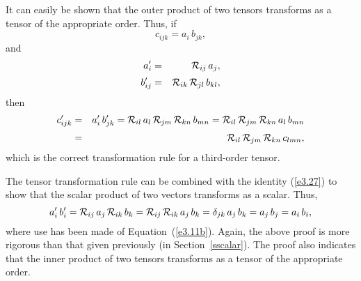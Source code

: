 It can easily be shown that the outer product of two tensors transforms as a tensor of the appropriate order.
Thus, if
\begin{equation}
c_{ijk} = a_i\,b_{jk},
\end{equation}
and
\begin{eqnarray}
a_i' &=& {\cal R}_{ij}\,a_j,\\[0.5ex]
b_{ij}'&=&{\cal R}_{ik}\,{\cal R}_{jl}\,b_{kl},
\end{eqnarray}
then
\begin{eqnarray}
c_{ijk}' &=& a_i'\,b_{jk}' = {\cal R}_{il}\,a_l\,{\cal R}_{jm}\,{\cal R}_{kn}\,b_{mn} = {\cal R}_{il}\,{\cal R}_{jm}\,{\cal R}_{kn}\,a_l\,b_{mn}\nonumber\\[0.5ex]
&=&{\cal R}_{il}\,{\cal R}_{jm}\,{\cal R}_{kn}\,c_{lmn},
\end{eqnarray}
which is the correct transformation rule for a third-order tensor.

The tensor transformation rule  can be combined with the identity (\ref{e3.27}) to show that the
scalar product of two vectors transforms as a scalar. Thus,
\begin{equation}
a_i'\,b_i' = {\cal R}_{ij}\,a_j\,{\cal R}_{ik}\,b_k ={\cal R}_{ij}\,{\cal R}_{ik}\,a_j\,b_k = \delta_{jk}\,a_j\,b_k = a_j\,b_j=a_i\,b_i,
\end{equation}
where use has been made of Equation~(\ref{e3.11b}). Again, the above proof is more rigorous than that given
previously (in Section~\ref{sscalar}). The proof also indicates that the inner product of
two tensors transforms as a tensor of the appropriate order. 

